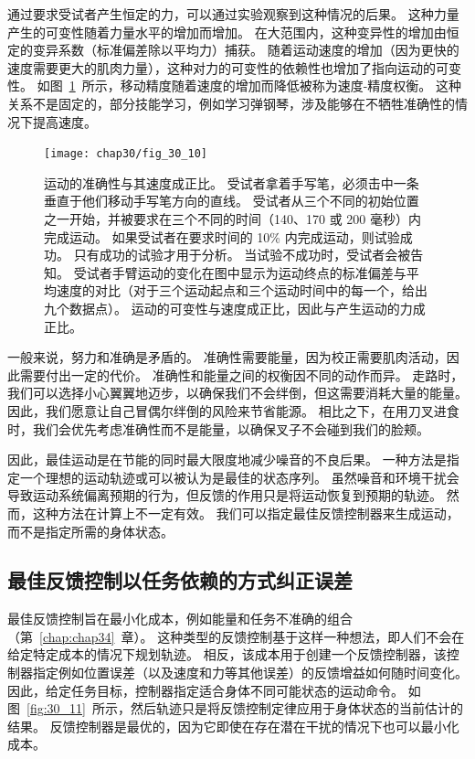 通过要求受试者产生恒定的力，可以通过实验观察到这种情况的后果。
这种力量产生的可变性随着力量水平的增加而增加。
在大范围内，这种变异性的增加由恒定的变异系数（标准偏差除以平均力）捕获。
随着运动速度的增加（因为更快的速度需要更大的肌肉力量），这种对力的可变性的依赖性也增加了指向运动的可变性。
如图~\ref{fig:30_10}~所示，移动精度随着速度的增加而降低被称为速度-精度权衡。
这种关系不是固定的，部分技能学习，例如学习弹钢琴，涉及能够在不牺牲准确性的情况下提高速度。


\begin{figure}[htbp]
	\centering
	\texttt{[image: chap30/fig\_30\_10]}
	\caption{运动的准确性与其速度成正比。
		受试者拿着手写笔，必须击中一条垂直于他们移动手写笔方向的直线。
		受试者从三个不同的初始位置之一开始，并被要求在三个不同的时间（140、170 或 200 毫秒）内完成运动。
		如果受试者在要求时间的 10\% 内完成运动，则试验成功。
		只有成功的试验才用于分析。
		当试验不成功时，受试者会被告知。
		受试者手臂运动的变化在图中显示为运动终点的标准偏差与平均速度的对比（对于三个运动起点和三个运动时间中的每一个，给出九个数据点）。
		运动的可变性与速度成正比，因此与产生运动的力成正比\cite{schmidt1979motor}。}
	\label{fig:30_10}
\end{figure}


一般来说，努力和准确是矛盾的。
准确性需要能量，因为校正需要肌肉活动，因此需要付出一定的代价。
准确性和能量之间的权衡因不同的动作而异。
走路时，我们可以选择小心翼翼地迈步，以确保我们不会绊倒，但这需要消耗大量的能量。
因此，我们愿意让自己冒偶尔绊倒的风险来节省能源。
相比之下，在用刀叉进食时，我们会优先考虑准确性而不是能量，以确保叉子不会碰到我们的脸颊。


因此，最佳运动是在节能的同时最大限度地减少噪音的不良后果。
一种方法是指定一个理想的运动轨迹或可以被认为是最佳的状态序列。
虽然噪音和环境干扰会导致运动系统偏离预期的行为，但反馈的作用只是将运动恢复到预期的轨迹。
然而，这种方法在计算上不一定有效。
我们可以指定最佳反馈控制器来生成运动，而不是指定所需的身体状态。



\subsection{最佳反馈控制以任务依赖的方式纠正误差}

最佳反馈控制旨在最小化成本，例如能量和任务不准确的组合（第~\ref{chap:chap34}~章）。
这种类型的反馈控制基于这样一种想法，即人们不会在给定特定成本的情况下规划轨迹。
相反，该成本用于创建一个反馈控制器，该控制器指定例如位置误差（以及速度和力等其他误差）的反馈增益如何随时间变化。
因此，给定任务目标，控制器指定适合身体不同可能状态的运动命令。
如图~\ref{fig:30_11}~所示，然后轨迹只是将反馈控制定律应用于身体状态的当前估计的结果。
反馈控制器是最优的，因为它即使在存在潜在干扰的情况下也可以最小化成本。


